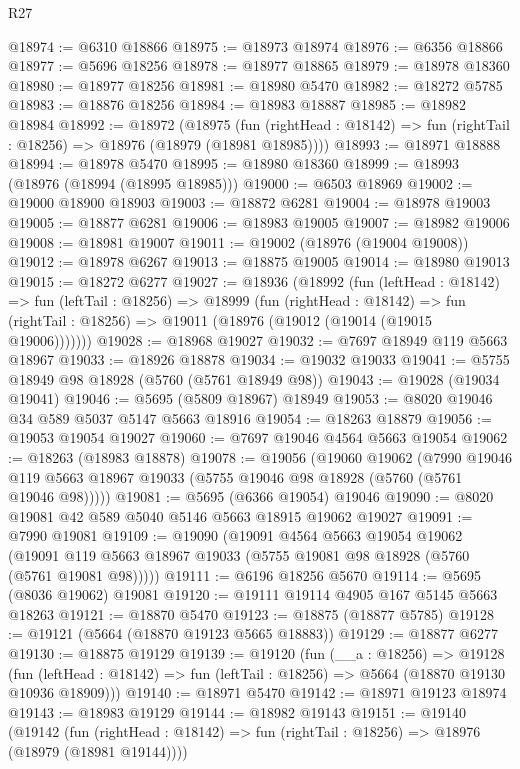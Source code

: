 \begin{lexlean}{R27}
\begin{coremodule}
@18974 := @6310 @18866
@18975 := @18973 @18974
@18976 := @6356 @18866
@18977 := @5696 @18256
@18978 := @18977 @18865
@18979 := @18978 @18360
@18980 := @18977 @18256
@18981 := @18980 @5470
@18982 := @18272 @5785
@18983 := @18876 @18256
@18984 := @18983 @18887
@18985 := @18982 @18984
@18992 := @18972
    (@18975
      (fun (rightHead : @18142) => fun (rightTail : @18256) => @18976 (@18979 (@18981 @18985))))
@18993 := @18971 @18888
@18994 := @18978 @5470
@18995 := @18980 @18360
@18999 := @18993 (@18976 (@18994 (@18995 @18985)))
@19000 := @6503 @18969
@19002 := @19000 @18900 @18903
@19003 := @18872 @6281
@19004 := @18978 @19003
@19005 := @18877 @6281
@19006 := @18983 @19005
@19007 := @18982 @19006
@19008 := @18981 @19007
@19011 := @19002 (@18976 (@19004 @19008))
@19012 := @18978 @6267
@19013 := @18875 @19005
@19014 := @18980 @19013
@19015 := @18272 @6277
@19027 := @18936
    (@18992
      (fun (leftHead : @18142) =>
      fun (leftTail : @18256) =>
      @18999
        (fun (rightHead : @18142) =>
        fun (rightTail : @18256) => @19011 (@18976 (@19012 (@19014 (@19015 @19006)))))))
@19028 := @18968 @19027
@19032 := @7697 @18949 @119 @5663 @18967
@19033 := @18926 @18878
@19034 := @19032 @19033
@19041 := @5755 @18949 @98 @18928 (@5760 (@5761 @18949 @98))
@19043 := @19028 (@19034 @19041)
@19046 := @5695 (@5809 @18967) @18949
@19053 := @8020 @19046 @34 @589 @5037 @5147 @5663 @18916
@19054 := @18263 @18879
@19056 := @19053 @19054 @19027
@19060 := @7697 @19046 @4564 @5663 @19054
@19062 := @18263 (@18983 @18878)
@19078 := @19056
    (@19060
      @19062
      (@7990 @19046 @119 @5663 @18967 @19033 (@5755 @19046 @98 @18928 (@5760 (@5761 @19046 @98)))))
@19081 := @5695 (@6366 @19054) @19046
@19090 := @8020 @19081 @42 @589 @5040 @5146 @5663 @18915 @19062 @19027
@19091 := @7990 @19081
@19109 := @19090
    (@19091
      @4564
      @5663
      @19054
      @19062
      (@19091 @119 @5663 @18967 @19033 (@5755 @19081 @98 @18928 (@5760 (@5761 @19081 @98)))))
@19111 := @6196 @18256 @5670
@19114 := @5695 (@8036 @19062) @19081
@19120 := @19111 @19114 @4905 @167 @5145 @5663 @18263
@19121 := @18870 @5470
@19123 := @18875 (@18877 @5785)
@19128 := @19121 (@5664 (@18870 @19123 @5665 @18883))
@19129 := @18877 @6277
@19130 := @18875 @19129
@19139 := @19120
    (fun (__a : @18256) =>
    @19128
      (fun (leftHead : @18142) => fun (leftTail : @18256) => @5664 (@18870 @19130 @10936 @18909)))
@19140 := @18971 @5470
@19142 := @18971 @19123 @18974
@19143 := @18983 @19129
@19144 := @18982 @19143
@19151 := @19140
    (@19142
      (fun (rightHead : @18142) => fun (rightTail : @18256) => @18976 (@18979 (@18981 @19144))))

\end{coremodule}
\end{lexlean}
